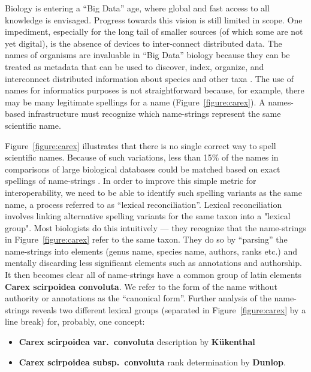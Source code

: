 \documentclass{bmcart}
\begin{document}
Biology is entering a ``Big Data'' age, where global and fast access to all knowledge is envisaged. Progress towards this vision is still limited in scope. One impediment, especially for the long tail of smaller sources (of which some are not yet digital), is the absence of devices to inter-connect distributed data. The names of organisms are invaluable in ``Big Data'' biology because they can be treated as metadata that can be used to discover, index, organize, and interconnect distributed information about species and other taxa \cite{Patterson2010}. The use of names for informatics purposes is not straightforward because, for example, there may be many legitimate spellings for a name (Figure~\ref{figure:carex}). A names-based infrastructure must recognize which name-strings represent the same scientific name.

Figure~\ref{figure:carex} illustrates that there is no single correct way to spell scientific names. Because of such variations, less than 15\% of the names in comparisons of large biological databases could be matched based on exact spellings of name-strings \cite{Patterson2016}. In order to improve this simple metric for interoperability, we need to be able to identify such spelling variants as the same name, a process referred to as ``lexical reconciliation''.  Lexical reconciliation involves linking alternative spelling variants for the same taxon into a "lexical group". Most biologists do this intuitively --- they recognize that the name-strings in Figure~\ref{figure:carex} refer to the same taxon. They do so by ``parsing'' the name-strings into elements (genus name, species name, authors, ranks etc.) and mentally discarding less significant elements such as annotations and authorship. It then becomes clear all of name-strings have a common group of latin elements  \textbf{Carex scirpoidea convoluta}. We refer to the form of the name without authority or annotations as the ``canonical form''. Further analysis of the name-strings  reveals two different lexical groups (separated in Figure~\ref{figure:carex} by a line break) for, probably, one concept:

\begin{itemize}

  \item \textbf{Carex scirpoidea var.\ convoluta} description by
    \textbf{Kükenthal}

  \item \textbf{Carex scirpoidea subsp.\ convoluta} rank determination by
    \textbf{Dunlop}.

\end{itemize}
\end{document}
